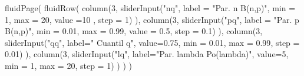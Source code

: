 \documentclass[
  letterpaper,
  DIV=11,
  numbers=noendperiod]{scrreprt}
\newenvironment{Shaded}{\begin{snugshade}}{\end{snugshade}}
\newcommand{\AttributeTok}[1]{\textcolor[rgb]{0.40,0.45,0.13}{#1}}
\newcommand{\DecValTok}[1]{\textcolor[rgb]{0.68,0.00,0.00}{#1}}
\newcommand{\FloatTok}[1]{\textcolor[rgb]{0.68,0.00,0.00}{#1}}
\newcommand{\FunctionTok}[1]{\textcolor[rgb]{0.28,0.35,0.67}{#1}}
\newcommand{\NormalTok}[1]{\textcolor[rgb]{0.00,0.23,0.31}{#1}}
\newcommand{\StringTok}[1]{\textcolor[rgb]{0.13,0.47,0.30}{#1}}
\begin{document}
\begin{Shaded}
\begin{Highlighting}[]
\FunctionTok{fluidPage}\NormalTok{(}
\FunctionTok{fluidRow}\NormalTok{(}
  \FunctionTok{column}\NormalTok{(}\DecValTok{3}\NormalTok{,}
         \FunctionTok{sliderInput}\NormalTok{(}\StringTok{"nq"}\NormalTok{, }\AttributeTok{label =} \StringTok{"Par. n B(n,p)"}\NormalTok{,}
              \AttributeTok{min =} \DecValTok{1}\NormalTok{, }\AttributeTok{max =} \DecValTok{20}\NormalTok{, }\AttributeTok{value =}\DecValTok{10}\NormalTok{ , }\AttributeTok{step =} \DecValTok{1}\NormalTok{)}
\NormalTok{         ),}
  \FunctionTok{column}\NormalTok{(}\DecValTok{3}\NormalTok{,}
          \FunctionTok{sliderInput}\NormalTok{(}\StringTok{"pq"}\NormalTok{, }\AttributeTok{label =} \StringTok{"Par. p B(n,p)"}\NormalTok{,}
                     \AttributeTok{min =} \FloatTok{0.01}\NormalTok{, }\AttributeTok{max =} \FloatTok{0.99}\NormalTok{, }\AttributeTok{value =} \FloatTok{0.5}\NormalTok{, }\AttributeTok{step =} \FloatTok{0.1}\NormalTok{)}
\NormalTok{         ),}
  \FunctionTok{column}\NormalTok{(}\DecValTok{3}\NormalTok{,}
         \FunctionTok{sliderInput}\NormalTok{(}\StringTok{"qq"}\NormalTok{, }\AttributeTok{label=}\StringTok{" Cuantil q"}\NormalTok{, }\AttributeTok{value=}\FloatTok{0.75}\NormalTok{, }\AttributeTok{min =} \FloatTok{0.01}\NormalTok{, }\AttributeTok{max =} \FloatTok{0.99}\NormalTok{, }
                     \AttributeTok{step =} \FloatTok{0.01}\NormalTok{)}
\NormalTok{         ),}
  \FunctionTok{column}\NormalTok{(}\DecValTok{3}\NormalTok{,}
         \FunctionTok{sliderInput}\NormalTok{(}\StringTok{"lq"}\NormalTok{, }\AttributeTok{label=}\StringTok{"Par. lambda Po(lambda)"}\NormalTok{, }\AttributeTok{value=}\DecValTok{5}\NormalTok{, }\AttributeTok{min =} \DecValTok{1}\NormalTok{, }\AttributeTok{max =} \DecValTok{20}\NormalTok{, }
                     \AttributeTok{step =} \DecValTok{1}\NormalTok{)}
\NormalTok{         )}
\NormalTok{  )}
\NormalTok{)}


\end{Highlighting}
\end{Shaded}
\end{document}
